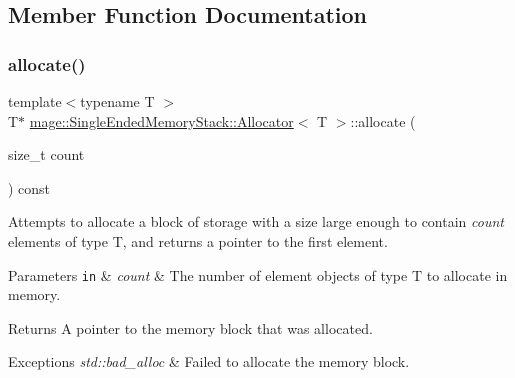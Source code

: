 \subsection{Member Function Documentation}
\mbox{\label{classmage_1_1_single_ended_memory_stack_1_1_allocator_afda7a44c3f17c9d41a6fe9f645fdc6a1}} 
\subsubsection{\texorpdfstring{allocate()}{allocate()}\hspace{0.1cm}{\footnotesize\ttfamily [1/2]}}
{\footnotesize\ttfamily template$<$typename T $>$ \\
T$\ast$ \mbox{\hyperlink{classmage_1_1_single_ended_memory_stack_1_1_allocator}{mage\+::\+Single\+Ended\+Memory\+Stack\+::\+Allocator}}$<$ T $>$\+::allocate (\begin{DoxyParamCaption}\item[{size\+\_\+t}]{count }\end{DoxyParamCaption}) const}

Attempts to allocate a block of storage with a size large enough to contain {\itshape count} elements of type {\ttfamily T}, and returns a pointer to the first element.


\begin{DoxyParams}[1]{Parameters}
\mbox{\tt in}  & {\em count} & The number of element objects of type {\ttfamily T} to allocate in memory. \\
\hline
\end{DoxyParams}
\begin{DoxyReturn}{Returns}
A pointer to the memory block that was allocated. 
\end{DoxyReturn}

\begin{DoxyExceptions}{Exceptions}
{\em std\+::bad\+\_\+alloc} & Failed to allocate the memory block. \\
\hline
\end{DoxyExceptions}
\mbox{\label{classmage_1_1_single_ended_memory_stack_1_1_allocator_ad7ace2215dcaacf633ae3bbe479cd2fc}} 
